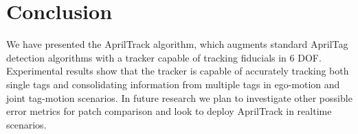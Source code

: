 \documentclass[letterpaper, 10 pt, conference]{ieeeconf}
\begin{document}
\section{Conclusion}

We have presented the AprilTrack algorithm, which augments standard AprilTag detection algorithms with a tracker capable of tracking fiducials in 6 DOF. Experimental results show that the tracker is capable of accurately tracking both single tags and consolidating information from multiple tags in ego-motion and joint tag-motion scenarios. In future research we plan to investigate other possible error metrics for patch comparison and look to deploy AprilTrack in realtime scenarios.


{}
\end{document}
